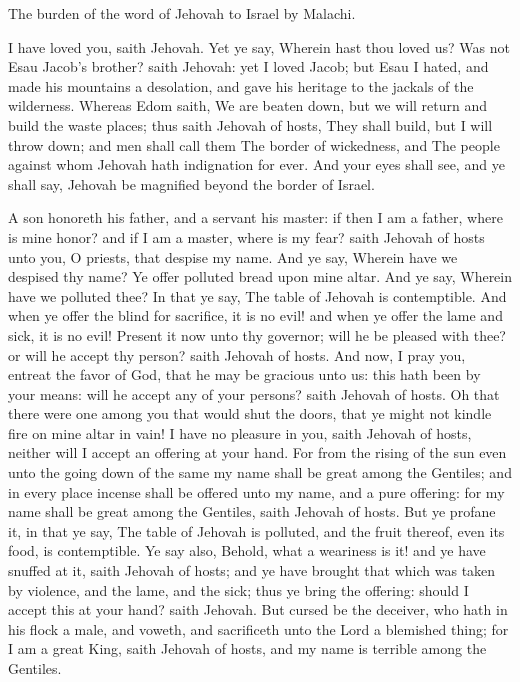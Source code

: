 




The burden of the word of Jehovah to Israel by Malachi.  

I have loved you, saith Jehovah. Yet ye say, Wherein hast thou loved us? Was not Esau Jacob’s brother? saith Jehovah: yet I loved Jacob; but Esau I hated, and made his mountains a desolation, and gave his heritage to the jackals of the wilderness. Whereas Edom saith, We are beaten down, but we will return and build the waste places; thus saith Jehovah of hosts, They shall build, but I will throw down; and men shall call them The border of wickedness, and The people against whom Jehovah hath indignation for ever. And your eyes shall see, and ye shall say, Jehovah be magnified beyond the border of Israel.  

A son honoreth his father, and a servant his master: if then I am a father, where is mine honor? and if I am a master, where is my fear? saith Jehovah of hosts unto you, O priests, that despise my name. And ye say, Wherein have we despised thy name? Ye offer polluted bread upon mine altar. And ye say, Wherein have we polluted thee? In that ye say, The table of Jehovah is contemptible. And when ye offer the blind for sacrifice, it is no evil! and when ye offer the lame and sick, it is no evil! Present it now unto thy governor; will he be pleased with thee? or will he accept thy person? saith Jehovah of hosts. And now, I pray you, entreat the favor of God, that he may be gracious unto us: this hath been by your means: will he accept any of your persons? saith Jehovah of hosts. Oh that there were one among you that would shut the doors, that ye might not kindle fire on mine altar in vain! I have no pleasure in you, saith Jehovah of hosts, neither will I accept an offering at your hand. For from the rising of the sun even unto the going down of the same my name shall be great among the Gentiles; and in every place incense shall be offered unto my name, and a pure offering: for my name shall be great among the Gentiles, saith Jehovah of hosts. But ye profane it, in that ye say, The table of Jehovah is polluted, and the fruit thereof, even its food, is contemptible. Ye say also, Behold, what a weariness is it! and ye have snuffed at it, saith Jehovah of hosts; and ye have brought that which was taken by violence, and the lame, and the sick; thus ye bring the offering: should I accept this at your hand? saith Jehovah. But cursed be the deceiver, who hath in his flock a male, and voweth, and sacrificeth unto the Lord a blemished thing; for I am a great King, saith Jehovah of hosts, and my name is terrible among the Gentiles. 

